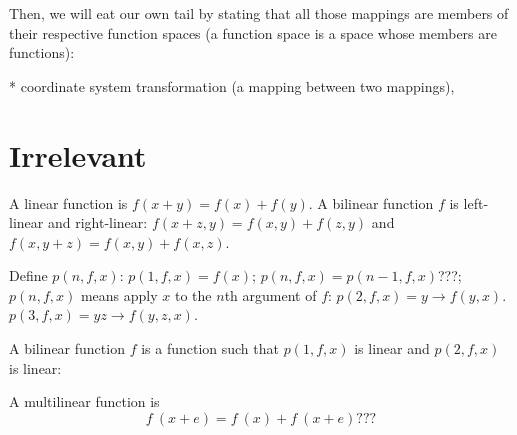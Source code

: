 Then, we will eat our own tail by stating that all those mappings are members of their respective function spaces
(a function space is a space whose members are functions):

* coordinate system transformation (a mapping between two mappings),

\section{Irrelevant}

A linear function is $f(x+y) = f(x) + f(y)$.
A bilinear function \(f\) is left-linear and right-linear:
\(
f(x+z,y) = f(x,y) + f(z,y)
\)
and
\(
f(x,y+z) = f(x,y) + f(x,z)
\).

Define \(p(n,f,x)\):
$p(1,f,x) = f(x)$;
$p(n,f,x) = p(n-1,f,x)$???;
$p(n,f,x)$ means apply $x$ to the $n$th argument of $f$:
$p(2,f,x) = y \to f(y,x)$.
$p(3,f,x) = y z \to f(y,z,x)$.

A bilinear function $f$ is a function such that $p(1,f,x)$ is linear
and $p(2,f,x)$ is linear:

A multilinear function is
\[
f~(x + e) = f~(x) + f~(x + e)???
\]
